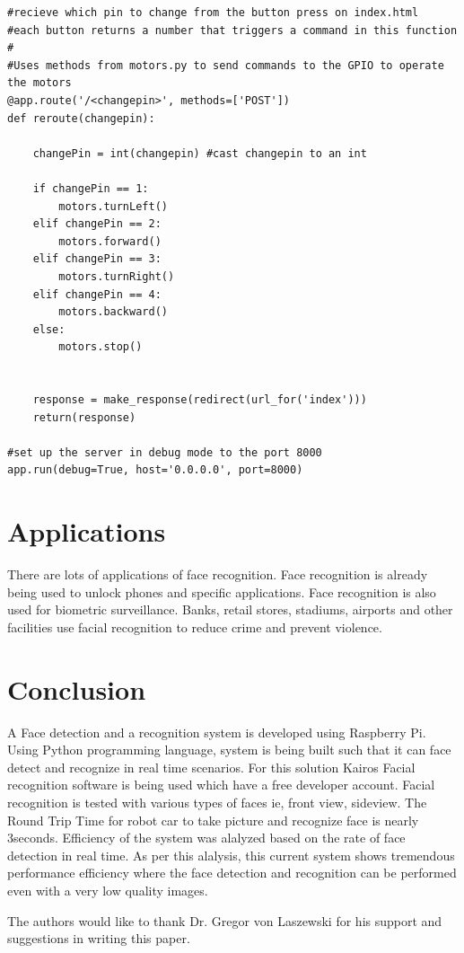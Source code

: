 \documentclass[sigconf]{acmart}
\begin{document}
\begin{lstlisting}
#recieve which pin to change from the button press on index.html
#each button returns a number that triggers a command in this function
#
#Uses methods from motors.py to send commands to the GPIO to operate the motors
@app.route('/<changepin>', methods=['POST'])
def reroute(changepin):

	changePin = int(changepin) #cast changepin to an int

	if changePin == 1:
		motors.turnLeft()
	elif changePin == 2:
		motors.forward()
	elif changePin == 3:
		motors.turnRight()
	elif changePin == 4:
		motors.backward()
	else:
		motors.stop()


	response = make_response(redirect(url_for('index')))
	return(response)

#set up the server in debug mode to the port 8000
app.run(debug=True, host='0.0.0.0', port=8000) 
\end{lstlisting}

\section{Applications}
There are lots of applications of face recognition. Face recognition is already being used to unlock phones and specific applications. Face recognition is also used for biometric surveillance. Banks, retail stores, stadiums, airports and other facilities use facial recognition to reduce crime and prevent violence.

\section{Conclusion}
A Face detection and a recognition system is developed using Raspberry Pi. Using Python programming language, system is being built such that it can face detect and recognize in real time scenarios. For this solution Kairos Facial recognition software is being used which have a free developer account. Facial recognition is tested with various types of faces ie, front view, sideview. The Round Trip Time for robot car to take picture and recognize face is nearly 3seconds. Efficiency of the system was alalyzed based on the rate of face detection in real time. As per this alalysis, this current system shows tremendous performance efficiency where the face detection and recognition can be performed even with a very low quality images.


\begin{acks}

The authors would like to thank Dr. Gregor von Laszewski for his support and suggestions in writing this paper.

\end{acks}


 
\end{document}
